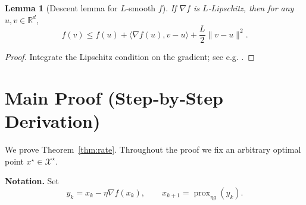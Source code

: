 \documentclass{article}
\newtheorem{lemma}{Lemma}
\begin{document}
\begin{lemma}[Descent lemma for $L$‑smooth $f$]\label{lem:descent}
If $\nabla f$ is $L$‑Lipschitz, then for any $u,v\in\mathbb{R}^{d}$,
\[
f(v)\le f(u)+\langle\nabla f(u),v-u\rangle+\frac{L}{2}\|v-u\|^{2}.
\]
\end{lemma}
\begin{proof}
Integrate the Lipschitz condition on the gradient; see e.g. \cite{Nesterov2004}. \qedhere
\end{proof}

\section*{Main Proof (Step‑by‑Step Derivation)}
We prove Theorem~\ref{thm:rate}. Throughout the proof we fix an arbitrary optimal point $x^{\star}\in\mathcal{X}^{\star}$.

\noindent\textbf{Notation.} Set 
\[
y_{k}=x_{k}-\eta\nabla f(x_{k}),\qquad x_{k+1}= \operatorname{prox}_{\eta g}(y_{k}).
\]
\end{document}
